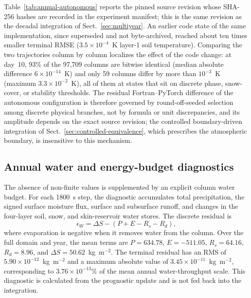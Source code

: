 Table~\ref{tab:annual-autonomous} reports the pinned source revision whose
SHA-256 hashes are recorded in the experiment manifest; this is the same
revision as the decadal integration of Sect.~\ref{sec:multiyear}. An
earlier code state of the same implementation, since superseded and not
byte-archived, reached about ten times smaller terminal RMSE
($3.5\times10^{-4}$~K layer-1 soil temperature). Comparing the two
trajectories column by column localizes the effect of the code change:
at day~10, 93\% of the 97,709 columns are bitwise identical (median
absolute difference $6\times10^{-14}$~K) and only 59 columns differ by more
than $10^{-3}$~K (maximum $3.3\times10^{-2}$~K), all of them at states that
sit on discrete phase, snow-cover, or stability thresholds. The residual
Fortran--PyTorch difference of the autonomous configuration is therefore
governed by round-off-seeded selection among discrete physical branches,
not by formula or unit discrepancies, and its amplitude depends on the
exact source revision; the controlled boundary-driven integration of
Sect.~\ref{sec:controlled-equivalence}, which prescribes the atmospheric
boundary, is insensitive to this mechanism.

\subsection{Annual water and energy-budget diagnostics}
\label{sec:annual-budget}

The absence of non-finite values is supplemented by an explicit column water
budget. For each 1800~s step, the diagnostic accumulates total precipitation,
the signed surface moisture flux, surface and subsurface runoff, and changes
in the four-layer soil, snow, and skin-reservoir water stores. The discrete
residual is
\begin{equation}
 \epsilon_W = \Delta S - (P+E-R_s-R_d),
\label{eq:water-residual}
\end{equation}
where evaporation is negative when it removes water from the column. Over the
full domain and year, the mean terms are $P=634.78$, $E=-511.05$,
$R_s=64.16$, $R_d=8.96$, and $\Delta S=50.62$~kg~m$^{-2}$. The terminal
residual has an RMS of $5.90\times10^{-12}$~kg~m$^{-2}$ and a maximum absolute
value of $3.45\times10^{-11}$~kg~m$^{-2}$, corresponding to
$3.76\times10^{-13}\%$ of the mean annual water-throughput scale. This
diagnostic is calculated from the prognostic update and is not fed back into
the integration.

